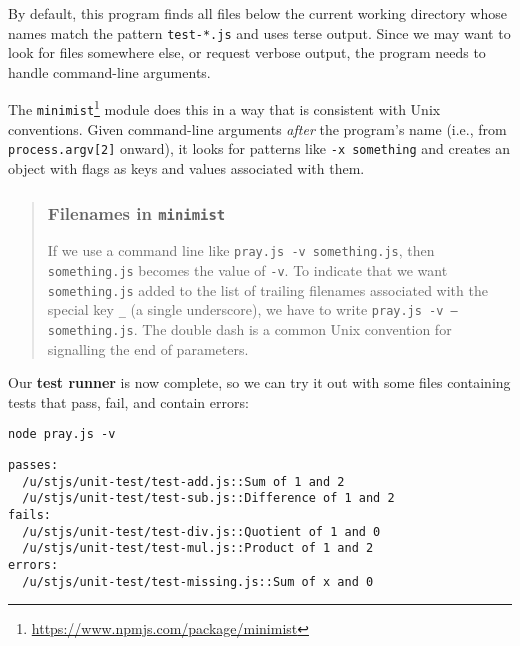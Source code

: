 \documentclass[krantzl]{krantz}
\newcommand{\glossref}[1]{\textbf{#1}}
\newenvironment{callout}{\savenotes\begin{tBox}\begin{quotation}\toggletrue{inbox}\renewcommand{\thempfootnote}{\arabic{footnote}}}{\end{quotation}\vspace{\baselineskip}\end{tBox}\togglefalse{inbox}\spewnotes}
\newcommand{\hreffoot}[2]{{#1}\footnote{\href{#2}{#2}}}
\begin{document}
By default,
this program finds all files below the current working directory
whose names match the pattern \texttt{test-*.js}
and uses terse output.
Since we may want to look for files somewhere else,
or request verbose output,
the program needs to handle command-line arguments.


The \hreffoot{\texttt{minimist}}{https://www.npmjs.com/package/minimist} module does this
in a way that is consistent with Unix conventions.
Given command-line arguments \emph{after} the program’s name
(i.e., from \texttt{process.argv[2]} onward),
it looks for patterns like \texttt{-x something}
and creates an object with flags as keys and values associated with them.

\begin{callout}


\subsubsection*{Filenames in \texttt{minimist}}


If we use a command line like \texttt{pray.js -v something.js},
then \texttt{something.js} becomes the value of \texttt{-v}.
To indicate that we want \texttt{something.js} added to the list of trailing filenames
associated with the special key \texttt{\_} (a single underscore),
we have to write \texttt{pray.js -v -- something.js}.
The double dash is a common Unix convention for signalling the end of parameters.

\end{callout}


Our \glossref{test runner} is now complete,
so we can try it out with some files containing tests that pass, fail, and contain errors:


\begin{lstlisting}[frame=shadowbox]
node pray.js -v
\end{lstlisting}



\begin{lstlisting}[frame=tblr,backgroundcolor=\color{black!5}]
passes:
  /u/stjs/unit-test/test-add.js::Sum of 1 and 2
  /u/stjs/unit-test/test-sub.js::Difference of 1 and 2
fails:
  /u/stjs/unit-test/test-div.js::Quotient of 1 and 0
  /u/stjs/unit-test/test-mul.js::Product of 1 and 2
errors:
  /u/stjs/unit-test/test-missing.js::Sum of x and 0
\end{lstlisting}
\end{document}
